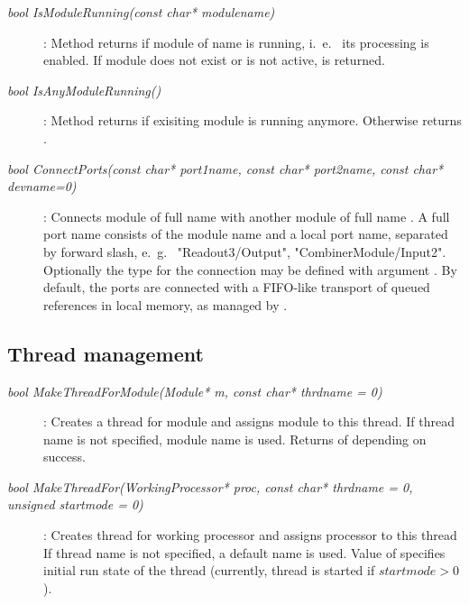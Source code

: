 \begin{description}
\item[\em bool IsModuleRunning\small (const char* modulename)] :
Method returns  if module of name 
is running, i.~e.~ its processing is enabled. If module does not exist
or is not active,  is returned. 
         
\item[\em bool IsAnyModuleRunning()] :
Method returns  if  exisiting module is running anymore.
Otherwise returns .

\item[\em bool ConnectPorts\small (const char* port1name,
                           const char* port2name,
                           const char* devname=0)] :
Connects module  of full name 
with another  module  of full name .
A full port name consists of the module name and a local port name,
separated by forward slash, e.~g.~ "Readout3/Output", "CombinerModule/Input2".
Optionally the  type for the connection  may
be defined with argument . By default, the ports are connected
with a FIFO-like transport of queued  references in local memory,
as managed by .			   
			   
\end{description}

\subsection{Thread management}	

\begin{description}

\item[\em bool MakeThreadForModule\small (Module* m, const char* thrdname = 0) ] :
Creates a thread for module  and assigns module to this thread.
If thread name  is not specified, module name is used.
Returns  of  
 depending on success.
	   

\item[\em bool MakeThreadFor\small (WorkingProcessor* proc, const char* thrdname = 0, unsigned startmode = 0) ] :
Creates thread for working processor  and assigns processor to this thread
If thread name  is not specified, a default name is used.
Value of  specifies initial run state of the thread
(currently, thread is started if $startmode>0$).


        

	   
\end{description}
	 
